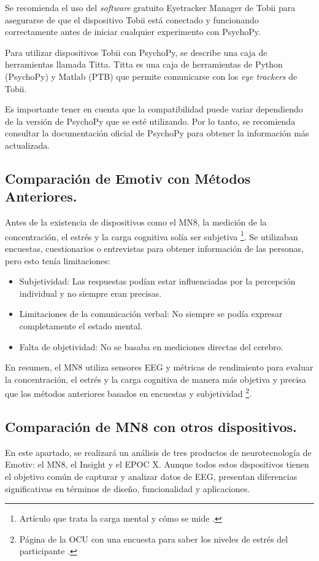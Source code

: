 Se recomienda el uso del \textit{software} gratuito Eyetracker Manager de Tobii para asegurarse de que el dispositivo Tobii está conectado y funcionando correctamente antes de iniciar cualquier experimento con PsychoPy.

Para utilizar dispositivos Tobii con PsychoPy, se describe una caja de herramientas llamada Titta. Titta es una caja de herramientas de Python (PsychoPy) y Matlab (PTB) que permite comunicarse con los \textit{eye trackers} de Tobii.

Es importante tener en cuenta que la compatibilidad puede variar dependiendo de la versión de PsychoPy que se esté utilizando. Por lo tanto, se recomienda consultar la documentación oficial de PsychoPy para obtener la información más actualizada.

\subsection{Comparación de Emotiv con Métodos Anteriores.}

Antes de la existencia de dispositivos como el MN8, la medición de la concentración, el estrés y la carga cognitiva solía ser subjetiva \cite{ArticuloMedicionCG}\footnote{Artículo que trata la carga mental y cómo se mide \cite{ArticuloMedicionCG}.}. Se utilizaban encuestas, cuestionarios o entrevistas para obtener información de las personas, pero esto tenía limitaciones:
\begin{itemize}
    \item Subjetividad: Las respuestas podían estar influenciadas por la percepción individual y no siempre eran precisas.
    \item Limitaciones de la comunicación verbal: No siempre se podía expresar completamente el estado mental.
    \item Falta de objetividad: No se basaba en mediciones directas del cerebro.
\end{itemize}

En resumen, el MN8 utiliza sensores EEG y métricas de rendimiento para evaluar la concentración, el estrés y la carga cognitiva de manera más objetiva y precisa que los métodos anteriores basados en encuestas y subjetividad \cite{EncuestaNivelEstres}\footnote{Página de la OCU con una encuesta para saber los niveles de estrés del participante \cite{EncuestaNivelEstres}.}.

\subsection{Comparación de MN8 con otros dispositivos.}
En este apartado, se realizará un análisis de tres productos de neurotecnología de Emotiv: el MN8, el Insight y el EPOC X. Aunque todos estos dispositivos tienen el objetivo común de capturar y analizar datos de EEG, presentan diferencias significativas en términos de diseño, funcionalidad y aplicaciones.

